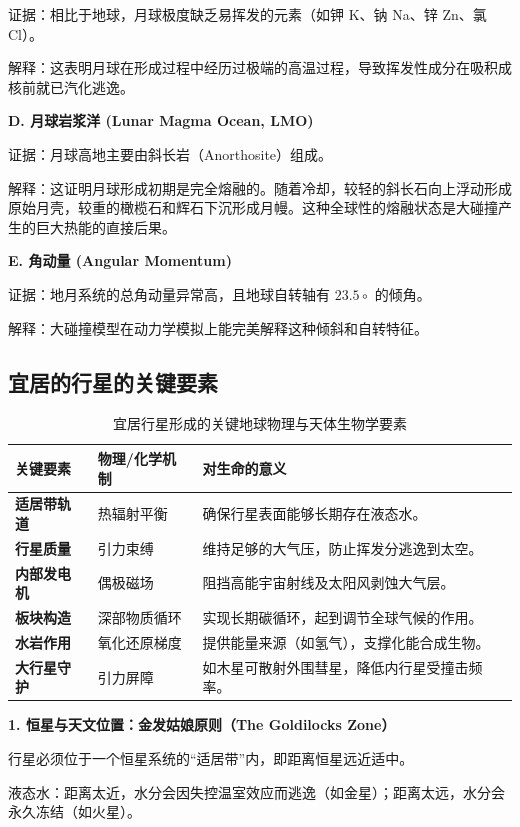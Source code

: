 \documentclass[12pt,a4paper]{article}
\begin{document}
	证据：相比于地球，月球极度缺乏易挥发的元素（如钾 K、钠 Na、锌 Zn、氯 Cl）。
	
	解释：这表明月球在形成过程中经历过极端的高温过程，导致挥发性成分在吸积成核前就已汽化逃逸。
	
	\textbf{D. 月球岩浆洋 (Lunar Magma Ocean, LMO)}
	
	证据：月球高地主要由斜长岩（Anorthosite）组成。
	
	解释：这证明月球形成初期是完全熔融的。随着冷却，较轻的斜长石向上浮动形成原始月壳，较重的橄榄石和辉石下沉形成月幔。这种全球性的熔融状态是大碰撞产生的巨大热能的直接后果。
	
	\textbf{E. 角动量 (Angular Momentum)}
	
	证据：地月系统的总角动量异常高，且地球自转轴有 $23.5∘$
	的倾角。
	
	解释：大碰撞模型在动力学模拟上能完美解释这种倾斜和自转特征。
	
	\subsection{宜居的行星的关键要素}
	\begin{table}[htbp]
		\centering
		\caption{宜居行星形成的关键地球物理与天体生物学要素}
		\small
		\begin{tabularx}{\textwidth}{l l X}
			\toprule
			关键要素 & 物理/化学机制 & 对生命的意义 \\
			\midrule
			\textbf{适居带轨道} & 热辐射平衡 & 确保行星表面能够长期存在液态水。 \\
			\addlinespace
			\textbf{行星质量} & 引力束缚 & 维持足够的大气压，防止挥发分逃逸到太空。 \\
			\addlinespace
			\textbf{内部发电机} & 偶极磁场 & 阻挡高能宇宙射线及太阳风剥蚀大气层。 \\
			\addlinespace
			\textbf{板块构造} & 深部物质循环 & 实现长期碳循环，起到调节全球气候的作用。 \\
			\addlinespace
			\textbf{水岩作用} & 氧化还原梯度 & 提供能量来源（如氢气），支撑化能合成生物。 \\
			\addlinespace
			\textbf{大行星守护} & 引力屏障 & 如木星可散射外围彗星，降低内行星受撞击频率。 \\
			\bottomrule
		\end{tabularx}
	\end{table}
	\textbf{1. 恒星与天文位置：金发姑娘原则（The Goldilocks Zone）}
	
	行星必须位于一个恒星系统的“适居带”内，即距离恒星远近适中。
	
	液态水：距离太近，水分会因失控温室效应而逃逸（如金星）；距离太远，水分会永久冻结（如火星）。
	
\end{document}
